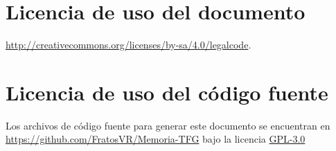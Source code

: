 \chapter*{Licencia de uso del documento}

\begin{flushright}

  \doclicenseThis

  \url{http://creativecommons.org/licenses/by-sa/4.0/legalcode}.
\end{flushright}

\chapter*{Licencia de uso del código fuente}

Los archivos de código fuente para generar este documento se encuentran en \url{https://github.com/FratosVR/Memoria-TFG} bajo la licencia \href{https://www.gnu.org/licenses/gpl-3.0.html}{GPL-3.0}